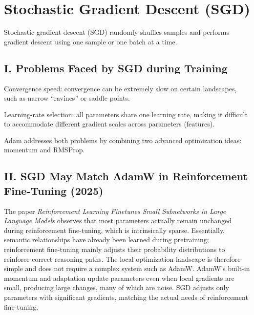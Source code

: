 \setcounter{section}{0}

\hypertarget{stochastic-gradient-descent-sgd}{%
\section{Stochastic Gradient Descent (SGD)}\label{stochastic-gradient-descent-sgd}}

Stochastic gradient descent (SGD) randomly shuffles samples and performs gradient descent using one sample or one batch at a time.

\hypertarget{i.-problems-faced-by-sgd-during-training}{%
\subsection{I. Problems Faced by SGD during Training}\label{i.-problems-faced-by-sgd-during-training}}

Convergence speed: convergence can be extremely slow on certain landscapes, such as narrow ``ravines'' or saddle points.

Learning-rate selection: all parameters share one learning rate, making it difficult to accommodate different gradient scales across parameters (features).

Adam addresses both problems by combining two advanced optimization ideas: momentum and RMSProp.

\hypertarget{ii.-sgd-may-match-adamw-in-reinforcement-fine-tuning-2025}{%
\subsection{II. SGD May Match AdamW in Reinforcement Fine-Tuning (2025)}\label{ii.-sgd-may-match-adamw-in-reinforcement-fine-tuning-2025}}

The paper \emph{Reinforcement Learning Finetunes Small Subnetworks in Large Language Models} observes that most parameters actually remain unchanged during reinforcement fine-tuning, which is intrinsically sparse. Essentially, semantic relationships have already been learned during pretraining; reinforcement fine-tuning mainly adjusts their probability distributions to reinforce correct reasoning paths. The local optimization landscape is therefore simple and does not require a complex system such as AdamW. AdamW's built-in momentum and adaptation update parameters even when local gradients are small, producing large changes, many of which are noise. SGD adjusts only parameters with significant gradients, matching the actual needs of reinforcement fine-tuning.

